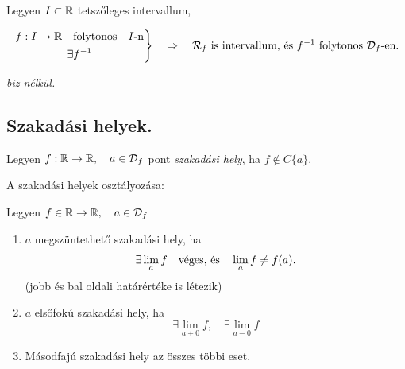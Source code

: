 \documentclass[a4paper,11.5pt]{article}
\begin{document}
	\begin{theorem}
		Legyen $I\subset\mathbb{R}$ tetszőleges intervallum,
		
		\[\left.\begin{gathered}
		f:I\to\mathbb{R}\quad \text{folytonos}\quad I\text{-n}\\
		\exists f^{-1}
		\end{gathered}\right\}\quad \Rightarrow\quad \mathcal{R}_f\text{ is intervallum, és }f^{-1}\text{ folytonos }\mathcal{D}_f\text{-en.}\]
		
		\textit{biz nélkül.}
	\end{theorem}
	\subsection{Szakadási helyek.}
	\begin{definition}
		Legyen $f:\mathbb{R}\to\mathbb{R},\quad a\in\mathcal{D}_f$ pont \textit{szakadási hely}, ha $f\notin C\{a\}$. 
	\end{definition}
	
	\begin{definition}
		A szakadási helyek osztályozása:
		
		Legyen $f\in\mathbb{R}\to \mathbb{R}, \quad a\in\mathcal{D}_f$
		\begin{enumerate}
			\item $a$ megszüntethető szakadási hely, ha
				\[ \exists\lim_a f \text{\quad véges, és\quad } \lim_a f\not=f(a). \]
				(jobb és bal oldali határértéke is létezik)
			\item $a$ elsőfokú szakadási hely, ha
				\[ \exists \lim_{a+0} f,\quad \exists\lim_{a-0}f \]
			\item Másodfajú szakadási hely az összes többi eset.
		\end{enumerate}
	\end{definition}
\end{document}

